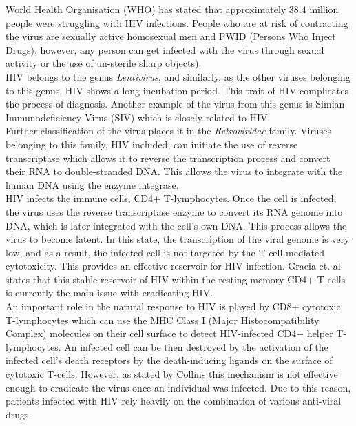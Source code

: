 World Health Organisation (WHO) has stated that approximately 38.4 million people were struggling with HIV infections. 
People who are at risk of contracting the virus are sexually active homosexual men and PWID (Persons Who Inject Drugs), however, any person can get infected with the virus through sexual activity or the use of un-sterile sharp objects).\cite{worldhealthorganization_2021_hivaids}\\
HIV belongs to the genus \textit{Lentivirus}, and similarly, as the other viruses belonging to this genus, HIV shows a long incubation period.
This trait of HIV complicates the process of diagnosis.
Another example of the virus from this genus is Simian Immunodeficiency Virus (SIV) which is closely related to HIV.\\
Further classification of the virus places it in the \textit{Retroviridae} family.
Viruses belonging to this family, HIV included, can initiate the use of reverse transcriptase which allows it to reverse the transcription process and convert their RNA to double-stranded DNA. This allows the virus to integrate with the human DNA using the enzyme integrase. \cite{fanalesbelasio_2010_hiv} \\
HIV infects the immune cells, CD4+ T-lymphocytes. 
Once the cell is infected, the virus uses the reverse transcriptase enzyme to convert its RNA genome into DNA, which is later integrated with the cell's own DNA. 
This process allows the virus to become latent.
In this state, the transcription of the viral genome is very low, and as a result, the infected cell is not targeted by the T-cell-mediated cytotoxicity. 
This provides an effective reservoir for HIV infection. \cite{chen_2022_the}
Gracia et. al states that this stable reservoir of HIV within the resting-memory CD4+ T-cells is currently the main issue with eradicating HIV. \cite{garca_2020_transcriptional}\\
An important role in the natural response to HIV is played by CD8+ cytotoxic T-lymphocytes which can use the MHC Class I (Major Histocompatibility Complex) molecules on their cell surface to detect HIV-infected CD4+ helper T-lymphocytes. 
An infected cell can be then destroyed by the activation of the infected cell’s death receptors by the death-inducing ligands on the surface of cytotoxic T-cells. \cite{gulzar_2004_cd8}
However, as stated by Collins this mechanism is not effective enough to eradicate the virus once an individual was infected. \cite{collins_2004_resistance}
Due to this reason, patients infected with HIV rely heavily on the combination of various anti-viral drugs. \cite{worldhealthorganization_2021_hivaids}

